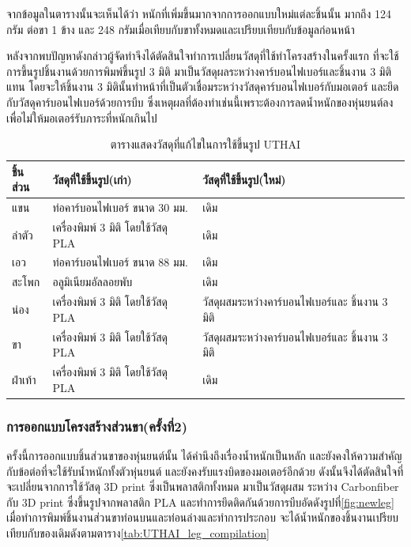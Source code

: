จากข้อมูลในตารางนั้นจะเห็นได้ว่า หนักที่เพิ่มขึ้นมากจากการออกแบบใหม่แต่ละชิ้นนั้น มากถึง 124 กรัม
ต่อขา 1 ข้าง และ 248 กรัมเมื่อเทียบกับขาทั้งหมดและเปรียบเทียบกับข้อมูลก่อนหน้า

หลังจากพบปัญหาดังกล่าวผู้จัดทำจึงได้ตัดสินใจทำการเปลี่ยนวัสดุที่ใช้ทำโครงสร้างในครั้งแรก
ที่จะใช้การขึ้นรูปชิ้นงานด้วยการพิมพ์ขึ้นรูป 3 มิติ มาเป็นวัสดุผลระหว่างคาร์บอนไฟเบอร์และชิ้นงาน 3 มิติแทน
โดยจะให้ชิ้นงาน 3 มิตินั้นทำหน้าที่เป็นตัวเชื่อมระหว่างวัสดุคาร์บอนไฟเบอร์กับมอเตอร์ และยึดกับวัสดุคาร์บอนไฟเบอร์ด้วยการบีบ
ซึ่งเหตุผลที่ต้องทำเช่นนี้เพราะต้องการลดน้ำหนักของหุ่นยนต์ลง เพื่อไม่ให้มอเตอร์รับภาระที่หนักเกินไป 

\begin{table}[ht]
	\centering
	\begin{tabular}{| l | l | l |}
		\hline
		ชิ้นส่วน & วัสดุที่ใช้ขึ้นรูป(เก่า) & วัสดุที่ใช้ขึ้นรูป(ใหม่) \\
        \hline
        แขน	& ท่อคาร์บอนไฟเบอร์ ขนาด 30 มม. & เดิม\\
        ลำตัว & เครื่องพิมพ์ 3 มิติ โดยใช้วัสดุ PLA & เดิม\\
        เอว	& ท่อคาร์บอนไฟเบอร์ ขนาด 88 มม. & เดิม\\
        สะโพก & อลูมิเนียมอัลลอยพับ & เดิม\\
        น่อง & เครื่องพิมพ์ 3 มิติ โดยใช้วัสดุ PLA & วัสดุผสมระหว่างคาร์บอนไฟเบอร์และ ชิ้นงาน 3 มิติ \\
        ขา & เครื่องพิมพ์ 3 มิติ โดยใช้วัสดุ PLA  & วัสดุผสมระหว่างคาร์บอนไฟเบอร์และ ชิ้นงาน 3 มิติ\\
        ฝ่าเท้า	& เครื่องพิมพ์ 3 มิติ โดยใช้วัสดุ PLA & เดิม\\
	    \hline
	\end{tabular}
	\caption{ตารางแสดงวัสดุที่แก้ไขในการใช้ขึ้นรูป UTHAI }
	\label{tab:UTHAI_materialchange}
\end{table}

\clearpage
\subsubsection*{การออกแบบโครงสร้างส่วนขา(ครั้งที่2)}
ครั้งนี้การออกแบบชิ้นส่วนขาของหุ่นยนต์นั้น ได้คำนึงถึงเรื่องน้ำหนักเป็นหลัก และยังคงให้ความสำคัญกับข้อต่อที่จะใช้รับน้ำหนักทั้งตัวหุ่นยนต์
และยังคงรับแรงบิดของมอเตอร์อีกด้วย ดังนั้นจึงได้ตัดสินใจที่จะเปลี่ยนจากการใช้วัสดุ 3D print  ซึ่งเป็นพลาสติกทั้งหมด มาเป็นวัสดุผสม 
ระหว่าง Carbonfiber กับ 3D print ซึ่งขึ้นรูปจากพลาสติก PLA และทำการยึดติดกันด้วยการบีบอัดดังรูปที่\ref{fig:newleg}
เมื่อทำการพิมพ์ชิ้นงานส่วนขาท่อนบนและท่อนล่างและทำการประกอบ จะได้น้ำหนักของชิ้นงานเปรียบเทียบกับของเดิมดังตามตาราง\ref{tab:UTHAI_leg_compilation}

